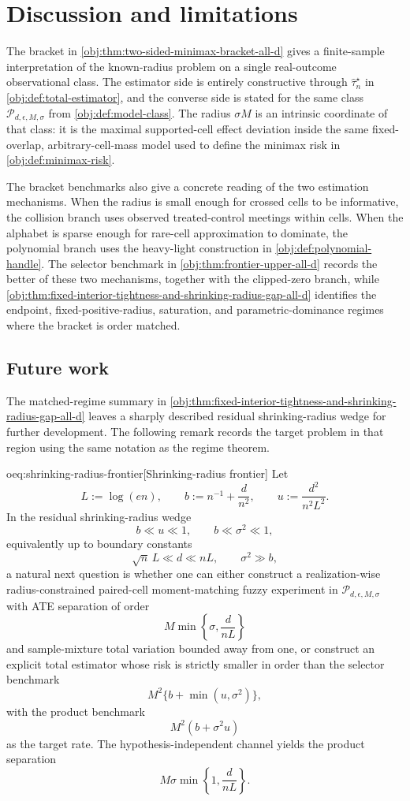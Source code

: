 \section{Discussion and limitations}

The bracket in \cref{obj:thm:two-sided-minimax-bracket-all-d} gives a finite-sample interpretation of the known-radius problem on a single real-outcome observational class. The estimator side is entirely constructive through \(\widehat\tau_n^{\star}\) in \cref{obj:def:total-estimator}, and the converse side is stated for the same class \(\mathcal P_{d,\epsilon,M,\sigma}\) from \cref{obj:def:model-class}. The radius \(\sigma M\) is an intrinsic coordinate of that class: it is the maximal supported-cell effect deviation inside the same fixed-overlap, arbitrary-cell-mass model used to define the minimax risk in \cref{obj:def:minimax-risk}.

The bracket benchmarks also give a concrete reading of the two estimation mechanisms. When the radius is small enough for crossed cells to be informative, the collision branch uses observed treated-control meetings within cells. When the alphabet is sparse enough for rare-cell approximation to dominate, the polynomial branch uses the heavy-light construction in \cref{obj:def:polynomial-handle}. The selector benchmark in \cref{obj:thm:frontier-upper-all-d} records the better of these two mechanisms, together with the clipped-zero branch, while \cref{obj:thm:fixed-interior-tightness-and-shrinking-radius-gap-all-d} identifies the endpoint, fixed-positive-radius, saturation, and parametric-dominance regimes where the bracket is order matched.

\subsection{Future work}

The matched-regime summary in \cref{obj:thm:fixed-interior-tightness-and-shrinking-radius-gap-all-d} leaves a sharply described residual shrinking-radius wedge for further development. The following remark records the target problem in that region using the same notation as the regime theorem.

\begin{remarkv}{oeq:shrinking-radius-frontier}[Shrinking-radius frontier]
Let
\[
L:=\log(en),\qquad
b:=n^{-1}+\frac{d}{n^2},\qquad
u:=\frac{d^2}{n^2L^2}.
\]
In the residual shrinking-radius wedge
\[
b\ll u\ll1,
\qquad
b\ll\sigma^2\ll1,
\]
equivalently up to boundary constants
\[
\sqrt n\,L\ll d\ll nL,
\qquad
\sigma^2\gg b,
\]
a natural next question is whether one can either construct a realization-wise radius-constrained paired-cell moment-matching fuzzy experiment in \(\mathcal P_{d,\epsilon,M,\sigma}\) with ATE separation of order
\[
M\min\left\{\sigma,\frac{d}{nL}\right\}
\]
and sample-mixture total variation bounded away from one, or construct an explicit total estimator whose risk is strictly smaller in order than the selector benchmark
\[
M^2\{b+\min(u,\sigma^2)\},
\]
with the product benchmark
\[
M^2(b+\sigma^2u)
\]
as the target rate. The hypothesis-independent channel yields the product separation
\[
M\sigma\min\left\{1,\frac{d}{nL}\right\}.
\]
\end{remarkv}

